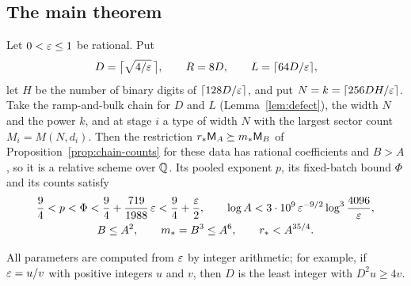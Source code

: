 \subsection{The main theorem}
\label{subsec:chains-main}

\begin{theorem}\label{thm:main}
Let \(0<\varepsilon\le1\) be rational. Put
\[
 D=\bigl\lceil\sqrt{4/\varepsilon}\,\bigr\rceil,\qquad R=8D,\qquad
 L=\lceil64D/\varepsilon\rceil,
\]
let \(H\) be the number of binary digits of \(\lceil128D/\varepsilon\rceil\),
and put \(N=k=\lceil256DH/\varepsilon\rceil\). Take the ramp-and-bulk chain
for \(D\) and \(L\) (Lemma~\ref{lem:defect}), the width \(N\) and the
power \(k\), and at stage \(i\) a type of width \(N\) with the largest
sector count \(M_i=M(N,d_i)\). Then the restriction
\(r_*\mathsf M_A\succeq m_*\mathsf M_B\) of Proposition~\ref{prop:chain-counts} for
these data has rational coefficients and \(B>A\), so it is a relative
scheme over \(\mathbb Q\). Its pooled exponent \(p\), its fixed-batch bound
\(\Phi\) and its counts satisfy
\begin{gather*}
 \frac94<p<\Phi<\frac94+\frac{719}{1988}\,\varepsilon<\frac94+\frac{\varepsilon}2,
 \qquad
 \log A<3\cdot10^9\,\varepsilon^{-9/2}\log^3\frac{4096}{\varepsilon},\\
 B\le A^2,\qquad m_*=B^3\le A^6,\qquad r_*<A^{35/4}.
\end{gather*}
\end{theorem}

All parameters are computed from \(\varepsilon\) by integer arithmetic; for
example, if \(\varepsilon=u/v\) with positive integers \(u\) and \(v\), then
\(D\) is the least integer with \(D^2u\ge4v\).

